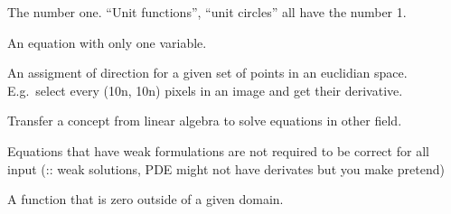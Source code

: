 
\begin{definition}[Unity]
    The number one. ``Unit functions'', ``unit circles'' all have the number 1.
\end{definition}

\begin{definition}[Univariate]
    An equation with only one variable.
\end{definition}

\begin{definition}\label{vectorfield}
    An assigment of direction for a given set of points in an euclidian space.
    E.g.\ select every (10n, 10n) pixels in an image and get their derivative.
\end{definition}

\begin{definition}
    Transfer a concept from linear algebra to solve equations in other field.

    Equations that have weak formulations are not required to be correct for
    all input (:: weak solutions, PDE might not have derivates but you make pretend)

\end{definition}

\begin{definition}
    A function that is zero outside of a given domain.
\end{definition}
